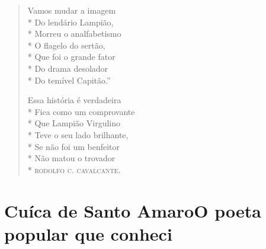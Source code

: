 \begin{verse}
Vamos mudar a imagem\\*
Do lendário Lampião,\\*
Morreu o analfabetismo\\*
O flagelo do sertão,\\*
Que foi o grande fator\\*
Do drama desolador\\*
Do temível Capitão.''

Essa história é verdadeira\\*
Fica como um comprovante\\*
Que Lampião Virgulino\\*
Teve o seu lado brilhante,\\*
Se não foi um benfeitor\\*
Não matou o trovador\\*
\textsc{rodolfo c. cavalcante}.
\end{verse}

\chapter[Cuíca de Santo Amaro -- O poeta popular que conheci]{Cuíca de Santo Amaro\break O poeta popular que conheci}

